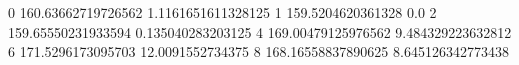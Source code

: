 0 160.63662719726562 1.1161651611328125
1 159.5204620361328 0.0
2 159.65550231933594 0.135040283203125
4 169.00479125976562 9.484329223632812
6 171.5296173095703 12.0091552734375
8 168.16558837890625 8.645126342773438
